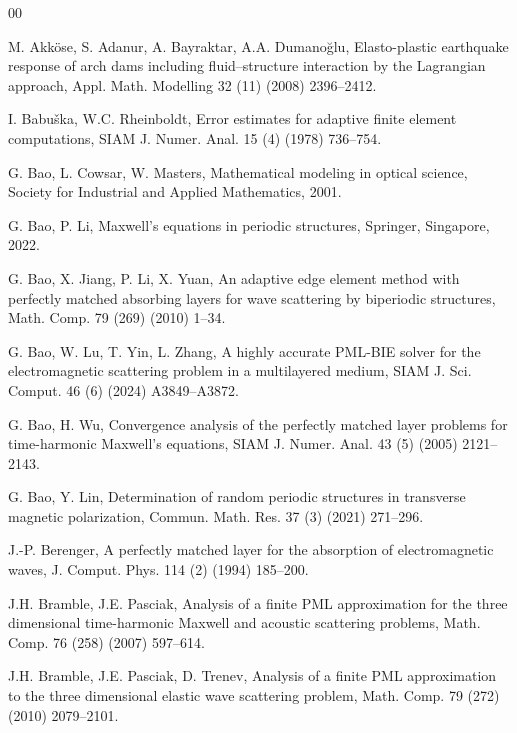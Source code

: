\documentclass[final,3p,times]{elsarticle}
\begin{document}
\begin{thebibliography}{00}


 M. Akk\"ose, S. Adanur, A. Bayraktar, A.A. Dumano\u{g}lu, Elasto-plastic earthquake response of arch dams including fluid–structure interaction by the Lagrangian approach, Appl. Math. Modelling 32 (11)  (2008) 2396--2412.

  I. Babu\v{s}ka, W.C. Rheinboldt, Error estimates for adaptive finite element computations, SIAM J. Numer. Anal. 15 (4) (1978) 736--754. 

 G. Bao, L. Cowsar, W. Masters,  Mathematical modeling in optical science, Society for Industrial and Applied Mathematics, 2001.

 G. Bao, P. Li, Maxwell's equations in periodic structures, Springer, Singapore, 2022.


 G. Bao, X. Jiang, P. Li, X. Yuan, An adaptive edge element method with perfectly matched absorbing layers for wave scattering by biperiodic structures, Math. Comp. 79 (269) (2010) 1--34.

 G. Bao, W. Lu, T. Yin, L. Zhang, A highly accurate PML-BIE solver for the electromagnetic scattering problem in a multilayered medium, SIAM J. Sci. Comput. 46 (6) (2024) A3849--A3872. 

 G. Bao, H. Wu,  Convergence analysis of the perfectly matched layer problems for time-harmonic Maxwell's equations, SIAM J. Numer. Anal. 43 (5) (2005) 2121--2143. 

  G. Bao, Y. Lin,  Determination of random periodic structures in transverse magnetic polarization, Commun. Math. Res. 37 (3) (2021) 271--296. 


 J.-P. Berenger, A perfectly matched layer for the absorption of electromagnetic waves, J. Comput. Phys. 114 (2) (1994) 185--200.


 J.H. Bramble, J.E. Pasciak, Analysis of a finite PML approximation for the three dimensional time-harmonic Maxwell and acoustic scattering problems, Math. Comp. 76 (258) (2007) 597--614. 

 J.H. Bramble, J.E. Pasciak, D. Trenev, Analysis of a finite PML approximation to the three dimensional elastic wave scattering problem, Math. Comp. 79 (272) (2010) 2079--2101.


\end{thebibliography}
\end{document}
